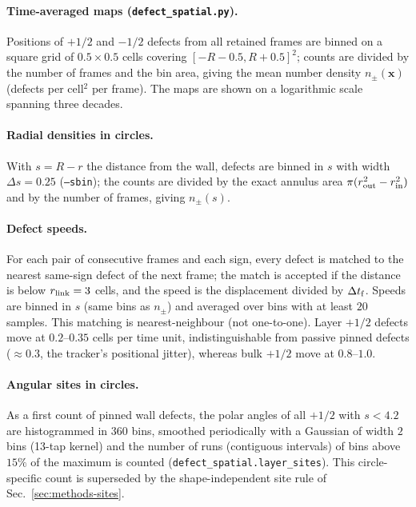 \paragraph{Time-averaged maps (\texttt{defect\_spatial.py}).}
Positions of $+1/2$ and $-1/2$ defects from all retained frames are binned on a square
grid of $0.5\times0.5$ cells covering $[-R-0.5,R+0.5]^2$; counts are divided by the number of
frames and the bin area, giving the mean number density $n_\pm(\mathbf{x})$ (defects per
cell$^2$ per frame). The maps are shown on a logarithmic scale spanning three decades.

\paragraph{Radial densities in circles.}
With $s=R-r$ the distance from the wall, defects are binned in $s$ with width
$\Delta s=0.25$ (\texttt{--sbin}); the counts are divided by the exact annulus area
$\pi(r_{\rm out}^2-r_{\rm in}^2)$ and by the number of frames, giving $n_\pm(s)$.

\paragraph{Defect speeds.}
For each pair of consecutive frames and each sign, every defect is matched to the nearest
same-sign defect of the next frame; the match is accepted if the distance is below
$r_{\rm link}=3$ cells, and the speed is the displacement divided by $\Delta t_{\rm f}$. Speeds are
binned in $s$ (same bins as $n_\pm$) and averaged over bins with at least $20$ samples.
This matching is nearest-neighbour (not one-to-one).
Layer $+1/2$ defects move at $0.2$--$0.35$ cells per time unit, indistinguishable from passive
pinned defects ($\approx0.3$, the tracker's positional jitter), whereas bulk $+1/2$ move at
$0.8$--$1.0$.

\paragraph{Angular sites in circles.}
As a first count of pinned wall defects, the polar angles of all $+1/2$ with $s<4.2$ are
histogrammed in $360$ bins, smoothed periodically with a Gaussian of width $2$ bins
(13-tap kernel) and the number of runs (contiguous intervals) of bins above $15\%$ of the
maximum is counted (\texttt{defect\_spatial.layer\_sites}). This circle-specific count is
superseded by the shape-independent site rule of Sec.~\ref{sec:methods-sites}.

